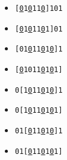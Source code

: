 \setlength{\columnsep}{-2.1in}
\begin{multicols}{2}
	\begin{itemize}[nolistsep,itemsep=2mm]
		\item \texttt{[\underline{0}1\underline{0}11\underline{0}]101}
		\item \texttt{[\underline{0}1\underline{0}11\underline{0}1]01}
		\item \texttt{[01\underline{0}11\underline{0}1\underline{0}]1}
		\item \texttt{[\underline{0}1011\underline{0}1\underline{0}1]}

		\item \texttt{0[1\underline{0}11\underline{0}1\underline{0}]1}
		\item \texttt{0[1\underline{0}11\underline{0}1\underline{0}1]}
		\item \texttt{01[\underline{0}11\underline{0}1\underline{0}]1}
		\item \texttt{01[\underline{0}11\underline{0}1\underline{0}1]}
	\end{itemize}
\end{multicols}
